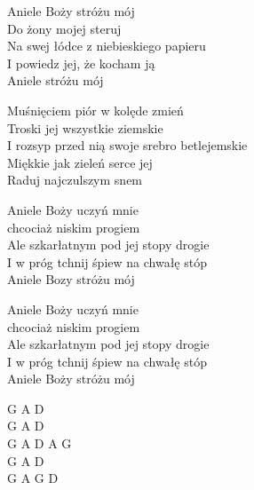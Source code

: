 \begin{text}
    Aniele Boży stróżu mój\\
    Do żony mojej steruj\\
    Na swej łódce z niebieskiego papieru\\
    I powiedz jej, że kocham ją\\
    Aniele stróżu mój

    Muśnięciem piór w kolęde zmień\\
    Troski jej wszystkie ziemskie\\
    I rozsyp przed nią swoje srebro betlejemskie\\
    Miękkie jak zieleń serce jej\\
    Raduj najczulszym snem

    Aniele Boży uczyń mnie\\
    chcociaż niskim progiem\\
    Ale szkarłatnym pod jej stopy drogie\\
    I w próg tchnij śpiew na chwałę stóp\\
    Aniele Bozy stróżu mój

    Aniele Boży uczyń mnie\\
    chcociaż niskim progiem\\
    Ale szkarłatnym pod jej stopy drogie\\
    I w próg tchnij śpiew na chwałę stóp\\
    Aniele Boży stróżu mój
\end{text}
\begin{chord}
    G A D\\
    G A D\\
    G A D A G\\
    G A D\\
    G A G D
\end{chord}